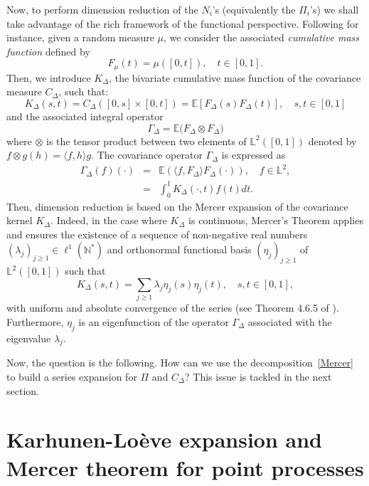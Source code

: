 \documentclass[aos]{imsart}
\theoremstyle{plain}
\theoremstyle{remark}
\newcommand{\1}{1}
\begin{document}
Now, to perform dimension reduction of the $N_i$'s (equivalently the  $\Pi_i$'s) we shall take advantage of the rich framework of the functional perspective. Following \cite{Cohn93} for instance, given a random measure $\mu$, we consider the associated \textit{cumulative mass function} defined by
\begin{equation}\label{F-mu}
F_\mu(t) = \mu( [0,t]), \quad t \in [0,1].
\end{equation}
Then, we introduce $K_{\Delta}$, the  bivariate cumulative mass function of the covariance measure $C_{\Delta}$, such that:
\[
K_{\Delta}(s,t)= C_{\Delta}([0,s]\times[0,t]) = \mathbb{E}[F_\Delta(s)F_\Delta(t)],\quad s,t\in[0,1]
\]  
and the associated integral operator
\[
\Gamma_{\Delta} = \mathbb{E} \Big( F_\Delta \otimes F_\Delta \Big)
\]
where $\otimes$ is the tensor product between two elements of $\mathbb L^2([0,1])$ denoted by $f\otimes g(h)=\langle f,h\rangle g$. The covariance operator $\Gamma_{\Delta}$ is expressed as
\begin{eqnarray*}
\Gamma_\Delta(f)(\cdot) &=&  \mathbb E (\langle f, F_\Delta \rangle F_\Delta(\cdot) ), \quad f \in {\mathbb L}^2, \\
&=& \int_0^1  K_{\Delta}(\cdot,t)f(t)dt.
\end{eqnarray*}
Then, dimension reduction is based on the Mercer expansion of the covariance kernel $K_{\Delta}$. Indeed, in the case where $K_\Delta$ is continuous, Mercer's Theorem applies and ensures the existence of a sequence of non-negative real numbers $(\lambda_j)_{j\geq 1}\in\ell^1(\mathbb N^*)$ and  orthonormal functional basis $(\eta_j)_{j\geq 1}$ of $\mathbb L^2([0,1])$ such that
\begin{equation}\label{Mercer}
K_\Delta(s,t)=\sum_{j\geq 1}\lambda_j\eta_j(s)\eta_j(t),\quad s,t\in[0,1],
\end{equation}
with uniform and absolute convergence of the series (see Theorem 4.6.5 of \cite{hsing2015theoretical}). Furthermore, $\eta_j$ is an eigenfunction of the operator $\Gamma_\Delta$ associated with the eigenvalue $\lambda_j$. 

Now, the question is the following. How can we use the decomposition~\eqref{Mercer} to build a series expansion for $\Pi$ and $C_\Delta$? This issue is tackled in the next section.


\section{Karhunen-Lo\`eve expansion and Mercer theorem for point processes}
\label{sec:KLMercer}
\end{document}
